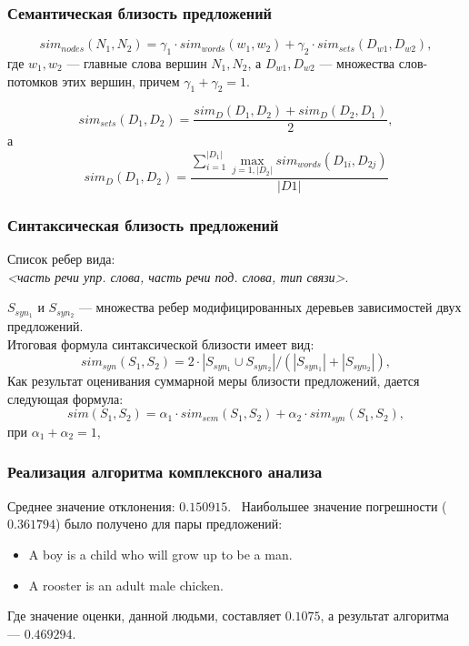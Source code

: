 \documentclass{beamer}
\begin{document}
\begin{frame}
\frametitle{Семантическая близость предложений}

$$ sim_{nodes}(N_1, N_2) = \gamma_1 \cdot sim_{words}(w_1,w_2) + \gamma_2 \cdot sim_{sets}(D_{w1}, D_{w2}), $$
где $w_1, w_2$ --- главные слова вершин $N_1, N_2$, а $D_{w1}, D_{w2}$ --- множества слов-потомков этих вершин,
причем $\gamma_1+\gamma_2=1$.

$$sim_{sets}(D_1, D_2) = \frac{sim_{D}(D_1,D_2) + sim_{D}(D_2, D_1)}{2}, $$
а 
$$sim_{D}(D_1, D_2) = \frac{ \sum \limits_{i=1}^{|D_1|} \max_{j=1,|D_2|} sim_{words}(D_{1i}, D_{2j}) } { |D1| }$$

\end{frame}

\begin{frame}
\frametitle{Синтаксическая близость предложений}
Список ребер вида:\\

\textit{<часть речи упр. слова, часть речи под. слова, тип связи>}.

$S_{syn_1}$ и $S_{syn_2}$ --- множества ребер 
модифицированных деревьев зависимостей двух предложений.\\
\vspace{0.2cm}
Итоговая формула синтаксической близости имеет вид: 
$$sim_{syn}(S_1, S_2) = 2 \cdot |S_{syn_1} \cup S_{syn_2}| / (|S_{syn_1}| + |S_{syn_2}|),$$ 
\vspace{0.1cm}
Как результат оценивания суммарной меры близости предложений, 
дается следующая формула:
$$sim(S_1, S_2) = \alpha_1 \cdot sim_{sem}(S_1, S_2) + \alpha_2 \cdot sim_{syn}(S_1, S_2),$$
 при $\alpha_1+\alpha_2=1$,

\end{frame}

\begin{frame}
\frametitle{Реализация алгоритма комплексного анализа}

Среднее значение отклонения: $0.150915$.\
\vspace{0.1cm}
Наибольшее значение погрешности ($0.361794$) было получено для пары предложений:
\begin{itemize}
\item {
	A boy is a child who will grow up to be a man.
}
\item {
	A rooster is an adult male chicken.
}
\end{itemize}
Где значение оценки, данной людьми, составляет $0.1075$, а результат алгоритма --- $0.469294$.

\end{frame}
\end{document}
